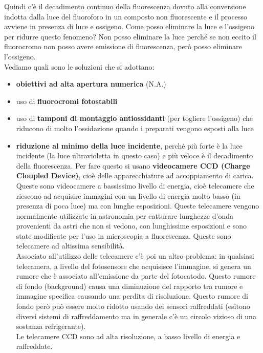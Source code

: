 \documentclass[11pt]{book}
\begin{document}
Quindi c’è il decadimento continuo della fluorescenza dovuto alla conversione indotta dalla luce del fluoroforo in un composto non fluorescente e il processo avviene in presenza di luce e ossigeno.
Come posso eliminare la luce e l’ossigeno per ridurre questo fenomeno? Non posso eliminare la luce perché se non eccito il fluorocromo non posso avere emissione di fluorescenza, però posso eliminare l’ossigeno.\\
Vediamo quali sono le soluzioni che si adottano:
\begin{itemize}
\item \textbf{obiettivi ad alta apertura numerica} (N.A.)
\item uso di \textbf{fluorocromi fotostabili}
\item uso di \textbf{tamponi di montaggio antiossidanti} (per togliere l’ossigeno) che riducono di molto l’ossidazione quando i preparati vengono esposti alla luce
\item \textbf{riduzione al minimo della luce incidente}, perché più forte è la luce incidente (la luce ultravioletta in questo caso) e più veloce è il decadimento della fluorescenza. Per fare questo si usano \textbf{videocamere CCD (Charge Cloupled Device)}, cioè delle apparecchiature ad accoppiamento di carica. Queste sono videocamere a bassissimo livello di energia, cioè telecamere che riescono ad acquisire immagini con un livello di energia molto basso (in presenza di poca luce) ma con lunghe esposizioni. Queste telecamere vengono normalmente utilizzate in astronomia per catturare lunghezze d’onda provenienti da astri che non si vedono, con lunghissime esposizioni e sono state modificate per l’uso in microscopia a fluorescenza. Queste sono telecamere ad altissima sensibilità.\\
Associato all'utilizzo delle telecamere c'è poi un altro problema: in qualsiasi telecamera, a livello del fotosensore che acquisisce l’immagine, si genera un rumore che è associato all’emissione da parte del fotocatodo. Questo rumore di fondo (background) causa una diminuzione del rapporto tra rumore e immagine specifica causando una perdita di risoluzione. Questo rumore di fondo però può essere molto ridotto usando dei sensori raffreddati (esitono diversi sistemi di raffreddamento ma in generale c’è un circolo vizioso di una sostanza refrigerante).\\
Le telecamere CCD sono ad alta risoluzione, a basso livello di energia e raffreddate.
\end{itemize}
\end{document}
